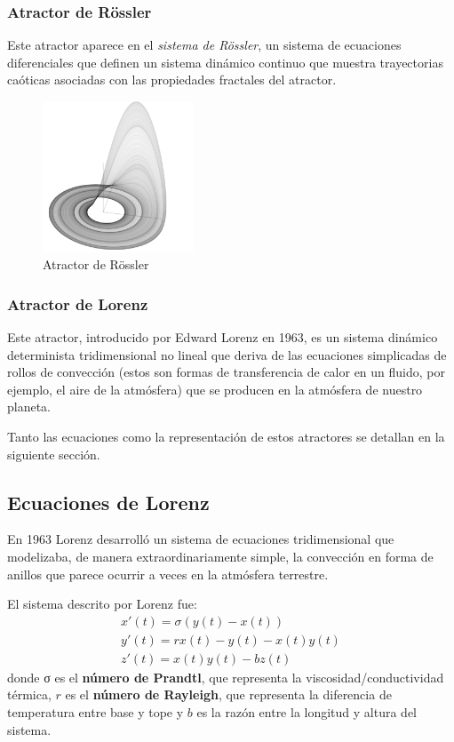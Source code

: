 \subsubsection{Atractor de Rössler}
Este atractor aparece en el \emph{sistema de Rössler}, un sistema de ecuaciones diferenciales que definen un sistema dinámico continuo que muestra trayectorias caóticas asociadas con las propiedades fractales del atractor.

\begin{figure}[hbtp]
\centering
\includegraphics[width = 0.4\textwidth]{img/rossler.png}
\caption{Atractor de Rössler}
\label{fig:rossler}
\end{figure}


\subsubsection{Atractor de Lorenz}
Este atractor, introducido por Edward Lorenz en 1963, es un sistema dinámico determinista tridimensional no lineal que deriva de las ecuaciones simplicadas de rollos de convección (estos son formas de transferencia de calor en un fluido, por ejemplo, el aire de la atmósfera) que se producen en la atmósfera de nuestro planeta.

Tanto las ecuaciones como la representación de estos atractores se detallan en la siguiente sección.

\subsection{Ecuaciones de Lorenz}
\begin{definition}
En 1963 Lorenz desarrolló un sistema de ecuaciones tridimensional que modelizaba, de manera extraordinariamente simple, la convección en forma de anillos que parece ocurrir a veces en la atmósfera terrestre.

El sistema descrito por Lorenz fue:
\[\begin{array}{l}
x'(t) = σ(y(t)-x(t)) \\
y'(t) = rx(t)-y(t)-x(t)y(t)\\
z'(t) = x(t)y(t)-bz(t)
\end{array}\]
donde σ es el \textbf{número de Prandtl}, que representa la viscosidad/conductividad térmica, $r$ es el \textbf{número de Rayleigh}, que representa la diferencia de temperatura entre base y tope y $b$ es la razón entre la longitud y altura del sistema.
\end{definition}

